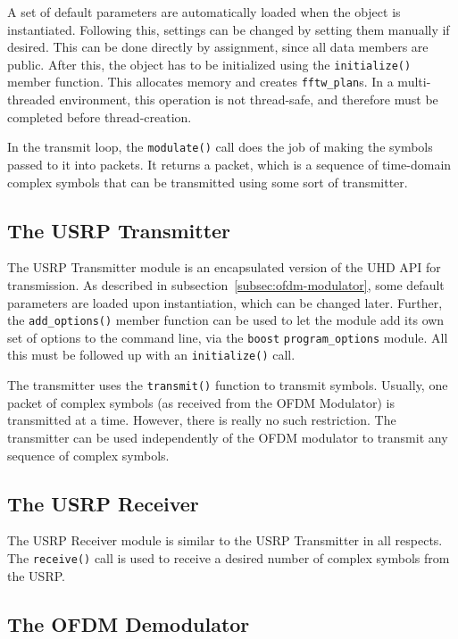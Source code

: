 A set of default parameters are automatically loaded when the object is
instantiated. Following this, settings can be changed by setting them manually
if desired. This can be done directly by assignment, since all data members are
public. After this, the object has to be initialized using the
\lstinline!initialize()! member function. This allocates memory and creates
\lstinline!fftw_plan!s. In a multi-threaded environment, this operation is not
thread-safe, and therefore must be completed before thread-creation.

In the transmit loop, the \lstinline!modulate()! call does the job of making
the symbols passed to it into packets. It returns a packet, which is a sequence
of time-domain complex symbols that can be transmitted using some sort of
transmitter.

\subsection{The USRP Transmitter}

The USRP Transmitter module is an encapsulated version of the UHD API for
transmission. As described in subsection~\ref{subsec:ofdm-modulator}, some
default parameters are loaded upon instantiation, which can be changed later.
Further, the \lstinline!add_options()! member function can be used to let the
module add its own set of options to the command line, via the
\lstinline!boost! \lstinline!program_options! module. All this must be
followed up with an \lstinline!initialize()! call.

The transmitter uses the \lstinline!transmit()! function to transmit symbols.
Usually, one packet of complex symbols (as received from the OFDM Modulator) is
transmitted at a time. However, there is really no such restriction. The
transmitter can be used independently of the OFDM modulator to transmit any
sequence of complex symbols.

\subsection{The USRP Receiver}

The USRP Receiver module is similar to the USRP Transmitter in all respects.
The \lstinline!receive()! call is used to receive a desired number of complex
symbols from the USRP.

\subsection{The OFDM Demodulator}

